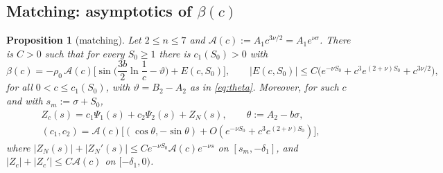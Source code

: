 \documentclass[11pt,a4paper]{amsart}
\newtheorem{proposition}[theorem]{Proposition}
\theoremstyle{definition}
\theoremstyle{remark}
\begin{document}
\subsection{Matching: asymptotics of $\beta(c)$}
\begin{proposition}[matching]\label{prop:beta}
Let $2\le n\le7$ and $\mathcal A(c):=A_1c^{3\nu/2}=A_1e^{\nu\sigma}$.  There is $C>0$ such that for every $S_0\ge1$ there is $c_1(S_0)>0$ with
\begin{equation}\label{eq:beta-asym}
\beta(c)=-\rho_0\,\mathcal A(c)\Big[\sin\Big(\frac{3b}{2}\ln\frac1c-\vartheta\Big)+E(c,S_0)\Big],\qquad
|E(c,S_0)|\le C\big(e^{-\nu S_0}+c^3e^{(2+\nu)S_0}+c^{3\nu/2}\big),
\end{equation}
for all $0<c\le c_1(S_0)$, with $\vartheta=B_2-A_2$ as in \eqref{eq:theta}.  Moreover, for such $c$ and with $s_m:=\sigma+S_0$,
\begin{equation}\label{eq:Z-outer}
\begin{gathered}
Z_c(s)=c_1\Psi_1(s)+c_2\Psi_2(s)+Z_N(s),\qquad \theta:=A_2-b\sigma,\\
(c_1,c_2)=\mathcal A(c)\big[(\cos\theta,-\sin\theta)+O(e^{-\nu S_0}+c^3e^{(2+\nu)S_0})\big],
\end{gathered}
\end{equation}
where $|Z_N(s)|+|Z_N'(s)|\le Ce^{-\nu S_0}\mathcal A(c)e^{-\nu s}$ on $[s_m,-\delta_1]$, and $|Z_c|+|Z_c'|\le C\mathcal A(c)$ on $[-\delta_1,0)$.
\end{proposition}
\end{document}
